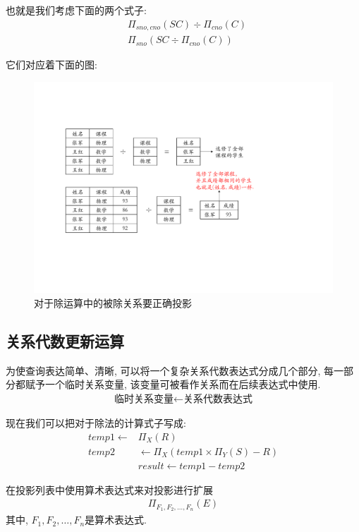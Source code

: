 也就是我们考虑下面的两个式子:
\begin{align*}
    &\Pi_{sno,cno}(SC) \div \Pi_{cno}(C)\\
    &\Pi_{sno}(SC\div \Pi_{cno}(C))
\end{align*}

它们对应着下面的图:
\begin{figure}[H]
    \centering
    \includegraphics[width=.7\textwidth]{./figure/除法要求.pdf}
    \caption{对于除运算中的被除关系要正确投影}
\end{figure}

\subsection{关系代数更新运算}

\begin{definition}[赋值运算]
为使查询表达简单、清晰, 可以将一个复杂关系代数表达式分成几个部分, 每一部分都赋予一个临时关系变量, 该变量可被看作关系而在后续表达式中使用.
\begin{align*}
    \text{临时关系变量} \leftarrow \text{关系代数表达式}
\end{align*}
\end{definition}

现在我们可以把对于除法的计算式子写成: 
\begin{align*}
    temp1 \leftarrow &\Pi_X(R) \\
    temp2 &\leftarrow \Pi_X(temp1 \times \Pi_Y(S)-R) \\
    &result \leftarrow temp1 - temp2
\end{align*}

\begin{definition}[广义投影]
    在投影列表中使用算术表达式来对投影进行扩展
    \begin{align*}
        \Pi_{F_1,F_2,\dots,F_n}(E)
    \end{align*}
    其中, $F_1,F_2,\dots,F_n$是算术表达式.
\end{definition}

